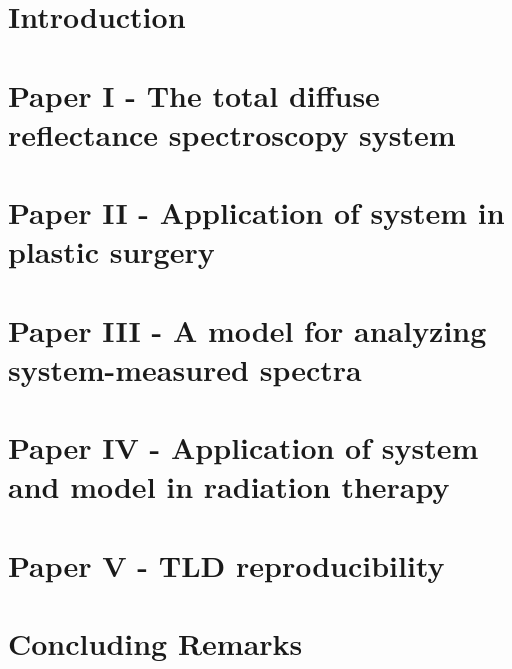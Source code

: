 \documentclass[letterpaper,12pt,twoside,openright]{report} %
\begin{document}

    \pagestyle{fancy}
    \fancyhead{}
    \fancyfoot{}
    \fancyfoot[CE,CO]{\thepage}



\chapter{Introduction}

\printbibliography[heading=subbibliography]

\chapter{Paper I - The total diffuse reflectance spectroscopy system}

\printbibliography[heading=subbibliography]

\chapter{Paper II - Application of system in plastic surgery}

\printbibliography[heading=subbibliography]

\chapter{Paper III - A model for analyzing system-measured spectra}

\printbibliography[heading=subbibliography]

\chapter{Paper IV - Application of system and model in radiation therapy}

\printbibliography[heading=subbibliography]

\chapter{Paper V - TLD reproducibility}

\printbibliography[heading=subbibliography]

\chapter{Concluding Remarks}

\printbibliography[heading=subbibliography]



\end{document}

